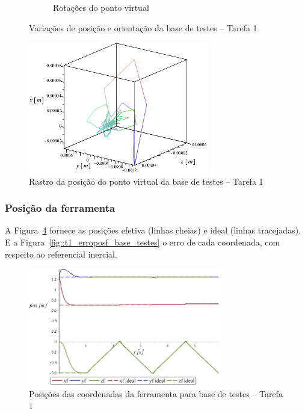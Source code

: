 \begin{figure}[h]
\begin{subfigure}[b]{0.45\textwidth}
        \caption{Rotações do ponto virtual}
        \label{fig::t1_q456_base_testes}
    \end{subfigure}
    \caption{Variações de posição e orientação da base de testes -- Tarefa 1}
    \label{fig::t1_q123456_base_testes}
\end{figure}

\begin{figure}[h!]
	\centering 
 	\includegraphics[width=0.70\textwidth]{figs/t1_pvirtural_base_testes}
 	\caption{Rastro da posição do ponto virtual da base de testes -- Tarefa 1}
 	\label{fig::t1_pvirtural_base_testes}
\end{figure}


\subsubsection{Posição da ferramenta}

A Figura~\ref{fig::t1_posf_base_testes} fornece as posições efetiva (linhas
cheias) e ideal (linhas tracejadas). E a
Figura~\ref{fig::t1_erroposf_base_testes} o erro de cada coordenada, com
respeito ao referencial inercial.

\begin{figure}[h!]
	\centering 
 	\includegraphics[width=0.75\textwidth]{figs/t1_posf_base_testes}
 	\caption{Posições das coordenadas da ferramenta para base de testes -- Tarefa
 	1}
 	\label{fig::t1_posf_base_testes}
\end{figure}


